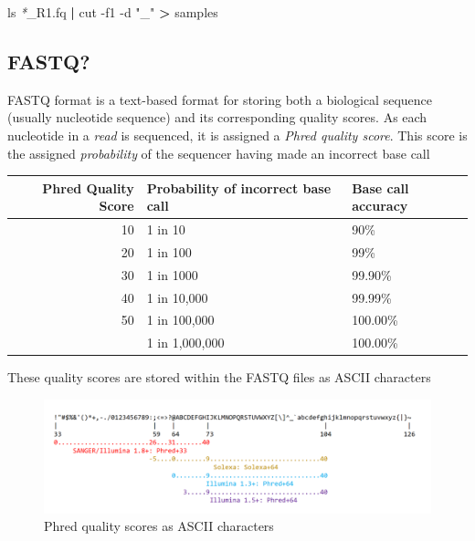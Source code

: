 \documentclass[
]{book}
\newenvironment{Shaded}{\begin{snugshade}}{\end{snugshade}}
\newcommand{\AttributeTok}[1]{\textcolor[rgb]{0.77,0.63,0.00}{#1}}
\newcommand{\FunctionTok}[1]{\textcolor[rgb]{0.00,0.00,0.00}{#1}}
\newcommand{\KeywordTok}[1]{\textcolor[rgb]{0.13,0.29,0.53}{\textbf{#1}}}
\newcommand{\NormalTok}[1]{#1}
\newcommand{\OperatorTok}[1]{\textcolor[rgb]{0.81,0.36,0.00}{\textbf{#1}}}
\newcommand{\PreprocessorTok}[1]{\textcolor[rgb]{0.56,0.35,0.01}{\textit{#1}}}
\newcommand{\StringTok}[1]{\textcolor[rgb]{0.31,0.60,0.02}{#1}}
\begin{document}
\begin{Shaded}
\begin{Highlighting}[]
    \FunctionTok{ls} \PreprocessorTok{*}\NormalTok{\_R1.fq }\KeywordTok{|} \FunctionTok{cut} \AttributeTok{{-}f1} \AttributeTok{{-}d} \StringTok{"\_"} \OperatorTok{\textgreater{}}\NormalTok{ samples}
\end{Highlighting}
\end{Shaded}

\hypertarget{fastq}{%
\subsection{FASTQ?}\label{fastq}}

FASTQ format is a text-based format for storing both a biological sequence (usually nucleotide sequence) and its corresponding quality scores. As each nucleotide in a \emph{read} is sequenced, it is assigned a \emph{Phred quality score}. This score is the assigned \emph{probability} of the sequencer having made an incorrect base call

\begin{longtable}{rll}
\toprule
\textbf{Phred Quality Score} & \textbf{Probability of incorrect base call} & \textbf{Base call accuracy}\\
\midrule
10 & 1 in 10 & 90\%\\
20 & 1 in 100 & 99\%\\
30 & 1 in 1000 & 99.90\%\\
40 & 1 in 10,000 & 99.99\%\\
50 & 1 in 100,000 & 100.00\%\\
\addlinespace
60 & 1 in 1,000,000 & 100.00\%\\
\bottomrule
\end{longtable}

These quality scores are stored within the FASTQ files as ASCII characters

\begin{figure}

{\centering \includegraphics[width=0.8\linewidth]{images/ascii} 

}

\caption{Phred quality scores as ASCII characters}\label{fig:unnamed-chunk-40}
\end{figure}
\end{document}
